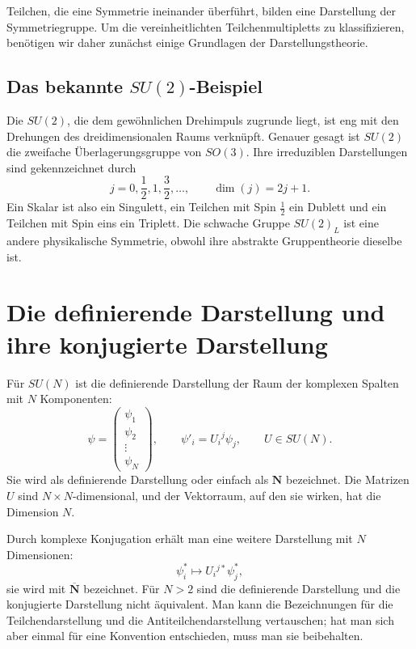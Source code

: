 Teilchen, die eine Symmetrie ineinander überführt, bilden eine Darstellung der Symmetriegruppe. Um die vereinheitlichten Teilchenmultipletts zu klassifizieren, benötigen wir daher zunächst einige Grundlagen der Darstellungstheorie.

\subsection{Das bekannte \texorpdfstring{\(SU(2)\)}{SU(2)}-Beispiel}

Die \(SU(2)\), die dem gewöhnlichen Drehimpuls zugrunde liegt, ist eng mit den Drehungen des dreidimensionalen Raums verknüpft. Genauer gesagt ist \(SU(2)\) die zweifache Überlagerungsgruppe von \(SO(3)\). Ihre irreduziblen Darstellungen sind gekennzeichnet durch
\begin{equation}
j=0,\frac12,1,\frac32,\ldots,
\qquad
\dim(j)=2j+1.
\label{eq:l10-su2-spins}
\end{equation}
Ein Skalar ist also ein Singulett, ein Teilchen mit Spin \(\tfrac12\) ein Dublett und ein Teilchen mit Spin eins ein Triplett. Die schwache Gruppe \(SU(2)_L\) ist eine andere physikalische Symmetrie, obwohl ihre abstrakte Gruppentheorie dieselbe ist.

\section{Die definierende Darstellung und ihre konjugierte Darstellung}

Für \(SU(N)\) ist die definierende Darstellung der Raum der komplexen Spalten mit \(N\) Komponenten:
\begin{equation}
\psi=
\begin{pmatrix}
\psi_1\\
\psi_2\\
\vdots\\
\psi_N
\end{pmatrix},
\qquad
\psi'_i=U_i{}^j\psi_j,
\qquad
U\in SU(N).
\label{eq:l10-defining}
\end{equation}
Sie wird als definierende Darstellung oder einfach als \(\mathbf N\) bezeichnet. Die Matrizen \(U\) sind \(N\times N\)-dimensional, und der Vektorraum, auf den sie wirken, hat die Dimension \(N\).

Durch komplexe Konjugation erhält man eine weitere Darstellung mit \(N\) Dimensionen:
\begin{equation}
\psi_i^*\longmapsto U_i{}^{j*}\psi_j^*,
\label{eq:l10-conjugate}
\end{equation}
sie wird mit \(\overline{\mathbf N}\) bezeichnet. Für \(N>2\) sind die definierende Darstellung und die konjugierte Darstellung nicht äquivalent. Man kann die Bezeichnungen für die Teilchendarstellung und die Antiteilchendarstellung vertauschen; hat man sich aber einmal für eine Konvention entschieden, muss man sie beibehalten.

